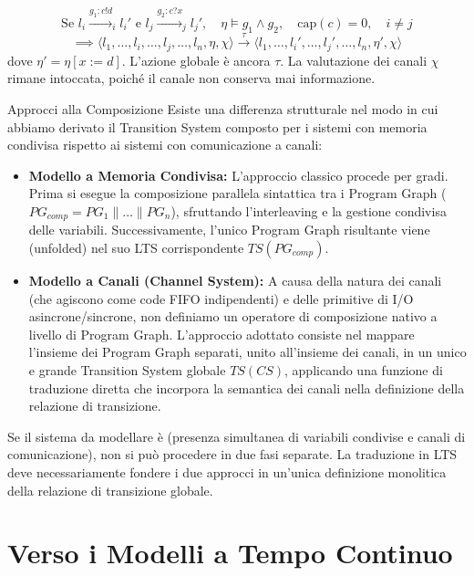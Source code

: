 \begin{itemize}
        \[ \text{Se } l_i \xrightarrow{g_1:c!d}_i l_i' \text{ e } l_j \xrightarrow{g_2:c?x}_j l_j', \quad \eta \models g_1 \land g_2, \quad \text{cap}(c) = 0, \quad i \neq j \]
        \[ \implies \langle l_1, \dots, l_i, \dots, l_j, \dots, l_n, \eta, \chi \rangle \xrightarrow{\tau} \langle l_1, \dots, l_i', \dots, l_j', \dots, l_n, \eta', \chi \rangle \]
        dove \(\eta' = \eta[x := d]\). L'azione globale è ancora \(\tau\). La valutazione dei canali \(\chi\) rimane intoccata, poiché il canale non conserva mai informazione.
\end{itemize}

\begin{observation}{Approcci alla Composizione}
  Esiste una differenza strutturale nel modo in cui abbiamo derivato il Transition System composto per i sistemi con memoria condivisa rispetto ai sistemi con comunicazione a canali:
  \begin{itemize}
    \item \textbf{Modello a Memoria Condivisa:} L'approccio classico procede per gradi. Prima si esegue la composizione parallela sintattica tra i Program Graph (\(PG_{comp} = PG_1 \parallel \dots \parallel PG_n\)), sfruttando l'interleaving e la gestione condivisa delle variabili. Successivamente, l'unico Program Graph risultante viene  (unfolded) nel suo LTS corrispondente \(TS(PG_{comp})\).
    \item \textbf{Modello a Canali (Channel System):} A causa della natura dei canali (che agiscono come code FIFO indipendenti) e delle primitive di I/O asincrone/sincrone, non definiamo un operatore di composizione nativo a livello di Program Graph. L'approccio adottato consiste nel mappare  l'insieme dei Program Graph separati, unito all'insieme dei canali, in un unico e grande Transition System globale \(TS(CS)\), applicando una funzione di traduzione diretta che incorpora la semantica dei canali nella definizione della relazione di transizione.
  \end{itemize}
  Se il sistema da modellare è  (presenza simultanea di variabili condivise e canali di comunicazione), non si può procedere in due fasi separate. La traduzione in LTS deve necessariamente fondere i due approcci in un'unica definizione monolitica della relazione di transizione globale.
\end{observation}



\section{Verso i Modelli a Tempo Continuo}

